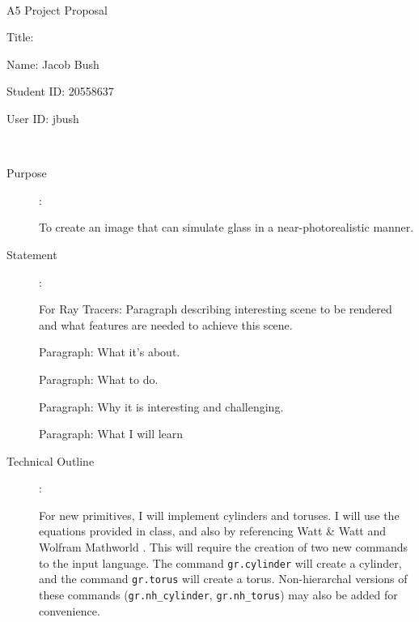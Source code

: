 \documentclass {article}
\begin{document}
~\vfill
\begin{center}
\Large

A5 Project Proposal

Title:

Name: Jacob Bush

Student ID: 20558637

User ID: jbush
\end{center}
\vfill ~\vfill~
\newpage
{}
\begin{description}
\item[Purpose]:

    To create an image that can simulate glass in a near-photorealistic manner.

\item[Statement]:

	For Ray Tracers: Paragraph describing interesting scene to be
		rendered and what features are needed to achieve
		this scene.

	Paragraph: What it's about.

	Paragraph: What to do.

	Paragraph: Why it is interesting and challenging.

	Paragraph: What I will learn

\item[Technical Outline]:


    
    For new primitives, I will implement cylinders and toruses. I will use the equations provided in class, and also by referencing Watt \& Watt \cite{WattQuad} and Wolfram Mathworld \cite{Weisstein}. This will require the creation of two new commands to the input language. The command  \texttt{gr.cylinder} will create a cylinder, and the command \texttt{gr.torus} will create a torus.
    Non-hierarchal versions of these commands (\texttt{gr.nh\_cylinder}, \texttt{gr.nh\_torus}) may also be added for convenience.


\end{description}
\end{document}
